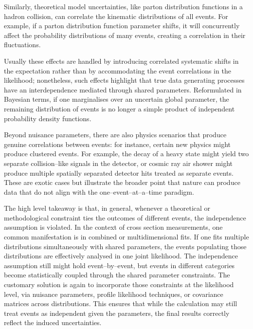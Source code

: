         Similarly, theoretical model uncertainties, like parton distribution functions in a hadron collision, can correlate the kinematic distributions of all events.
        For example, if a parton distribution function parameter shifts, it will concurrently affect the probability distributions of many events, creating a correlation in their fluctuations.
        
        Usually these effects are handled by introducing correlated systematic shifts in the expectation rather than by accommodating the event correlations in the likelihood;
        nonetheless, such effects highlight that true data generating processes have an interdependence mediated through shared parameters.
        Reformulated in Bayesian terms, if one marginalises over an uncertain global parameter, the remaining distribution of events is no longer a simple product of independent probability density functions.
        
        Beyond nuisance parameters, there are also physics scenarios that produce genuine correlations between events: for instance, certain new physics might produce clustered events.
        For example, the decay of a heavy state might yield two separate collision--like signals in the detector, or cosmic ray air shower might produce multiple spatially separated detector hits treated as separate events.
        These are exotic cases but illustrate the broader point that nature can produce data that do not align with the one--event--at--a--time paradigm.
        
        The high level takeaway is that, in general, whenever a theoretical or methodological constraint ties the outcomes of different events, the independence assumption is violated.
        In the context of cross section measurements, one common manifestation is in combined or multidimensional fits.
        If one fits multiple distributions simultaneously with shared parameters, the events populating those distributions are effectively analysed in one joint likelihood.
        The independence assumption still might hold event--by--event, but events in different categories become statistically coupled through the shared parameter constraints.
        The customary solution is again to incorporate those constraints at the likelihood level, via nuisance parameters, profile likelihood techniques, or covariance matrices across distributions.
        This ensures that while the calculation may still treat events as independent given the parameters, the final results correctly reflect the induced uncertainties.

